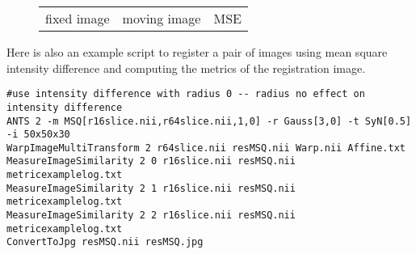 \begin{figure}
    \label{fig:metric_example}
    \centering
    \begin{tabular}[h]{c|c|c}
        fixed image &
        moving image & 
        MSE  \\
    \end{tabular} 
\end{figure}
Here is also an example script to register a pair of images using mean square intensity difference and computing the metrics of the registration image.
\begin{verbatim}
#use intensity difference with radius 0 -- radius no effect on intensity difference
ANTS 2 -m MSQ[r16slice.nii,r64slice.nii,1,0] -r Gauss[3,0] -t SyN[0.5] -i 50x50x30
WarpImageMultiTransform 2 r64slice.nii resMSQ.nii Warp.nii Affine.txt
MeasureImageSimilarity 2 0 r16slice.nii resMSQ.nii metricexamplelog.txt
MeasureImageSimilarity 2 1 r16slice.nii resMSQ.nii metricexamplelog.txt
MeasureImageSimilarity 2 2 r16slice.nii resMSQ.nii metricexamplelog.txt
ConvertToJpg resMSQ.nii resMSQ.jpg
\end{verbatim}

